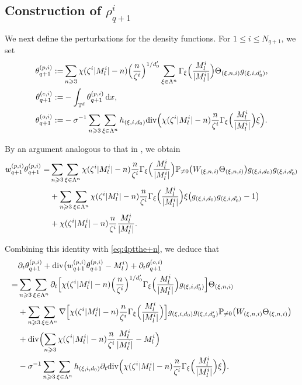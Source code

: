 \documentclass[UTF-8,reqno]{amsart}
\numberwithin{equation}{section}
\theoremstyle{definition}
\def\dif{{\mathord{{\rm d}}}}
\def\geq{\geqslant}
\def\leq{\leqslant}
\def\div{\mathord{{\rm div}}}
\def\dif{{\mathord{{\rm d}}}}
\def\geq{\geqslant}
\def\leq{\leqslant}
\def\div{\mathord{{\rm div}}}
\begin{document}
\subsection{Construction of $\rho^{i}_{q+1}$}\label{sec:con:the}
We next define the perturbations for the density functions. 
For $1\leq i\leq N_{q+1}$, we set
\begin{align}
\theta_{q+1}^{(p,i)}
:=
&\sum_{n\geq3}
\chi(\zeta^i|M_l^i|-n)
\Bigl(\frac{n}{\zeta^i}\Bigr)^{1/d_0'}
\sum_{\xi\in\Lambda^n}
\Gamma_\xi\Bigl(\frac{M_l^i}{|M_l^i|}\Bigr)
\Theta_{(\xi,n,i)}
g_{(\xi,i,d_0')},
\notag\\
\theta_{q+1}^{(c,i)}
:=
&-
\int_{\mathbb{T}^d}
\theta_{q+1}^{(p,i)}\,\dif x,
\notag\\
\theta_{q+1}^{(o,i)}
:=
&-
\sigma^{-1}
\sum_{n\geq3}
\sum_{\xi\in\Lambda^n}
h_{(\xi,i,d_0)}
\div\Bigl(
\chi(\zeta^i|M_l^i|-n)
\frac{n}{\zeta^i}
\Gamma_\xi\Bigl(\frac{M_l^i}{|M_l^i|}\Bigr)
\xi
\Bigr).
\notag
\end{align}

By an argument analogous to that in \cite[(5.5)]{LRZ25}, we obtain
\begin{align}
w_{q+1}^{(p,i)}
\theta_{q+1}^{(p,i)}
=
&
\sum_{n\geq3}
\sum_{\xi\in\Lambda^n}
\chi(\zeta^i|M_l^i|-n)
\frac{n}{\zeta^i}
\Gamma_\xi\Bigl(\frac{M_l^i}{|M_l^i|}\Bigr)
\mathbb{P}_{\neq0}
\bigl(
W_{(\xi,n,i)}
\Theta_{(\xi,n,i)}
\bigr)
g_{(\xi,i,d_0)}
g_{(\xi,i,d_0')}
\notag\\
&+
\sum_{n\geq3}
\sum_{\xi\in\Lambda^n}
\chi(\zeta^i|M_l^i|-n)
\frac{n}{\zeta^i}
\Gamma_\xi\Bigl(\frac{M_l^i}{|M_l^i|}\Bigr)
\xi
\bigl(
g_{(\xi,i,d_0)}
g_{(\xi,i,d_0')}
-1
\bigr)
\notag\\
&+
\chi(\zeta^i|M_l^i|-n)
\frac{n}{\zeta^i}
\frac{M_l^i}{|M_l^i|}.
\notag
\end{align}

Combining this identity with \eqref{eq:4ptthe+n}, we deduce that
\begin{align}
&
\partial_t\theta_{q+1}^{(p,i)}
+
\div\bigl(
w_{q+1}^{(p,i)}
\theta_{q+1}^{(p,i)}
-
M_l^i
\bigr)
+
\partial_t\theta_{q+1}^{(o,i)}
\notag\\
=
&
\sum_{n\geq3}
\sum_{\xi\in\Lambda^n}
\partial_t
\Bigl[
\chi(\zeta^i|M_l^i|-n)
\Bigl(\frac{n}{\zeta^i}\Bigr)^{1/d_0'}
\Gamma_\xi\Bigl(\frac{M_l^i}{|M_l^i|}\Bigr)
g_{(\xi,i,d_0')}
\Bigr]
\Theta_{(\xi,n,i)}
\notag\\
&+
\sum_{n\geq3}
\sum_{\xi\in\Lambda^n}
\nabla
\Bigl[
\chi(\zeta^i|M_l^i|-n)
\frac{n}{\zeta^i}
\Gamma_\xi\Bigl(\frac{M_l^i}{|M_l^i|}\Bigr)
\Bigr]
g_{(\xi,i,d_0)}
g_{(\xi,i,d_0')}
\mathbb{P}_{\neq0}
\bigl(
W_{(\xi,n,i)}
\Theta_{(\xi,n,i)}
\bigr)
\notag\\
&+
\div
\Bigl(
\sum_{n\geq3}
\chi(\zeta^i|M_l^i|-n)
\frac{n}{\zeta^i}
\frac{M_l^i}{|M_l^i|}
-
M_l^i
\Bigr)
\notag\\
&-
\sigma^{-1}
\sum_{n\geq3}
\sum_{\xi\in\Lambda^n}
h_{(\xi,i,d_0)}
\partial_t
\div
\Bigl(
\chi(\zeta^i|M_l^i|-n)
\frac{n}{\zeta^i}
\Gamma_\xi\Bigl(\frac{M_l^i}{|M_l^i|}\Bigr)
\xi
\Bigr).
\label{wq+1good}
\end{align}
\end{document}
